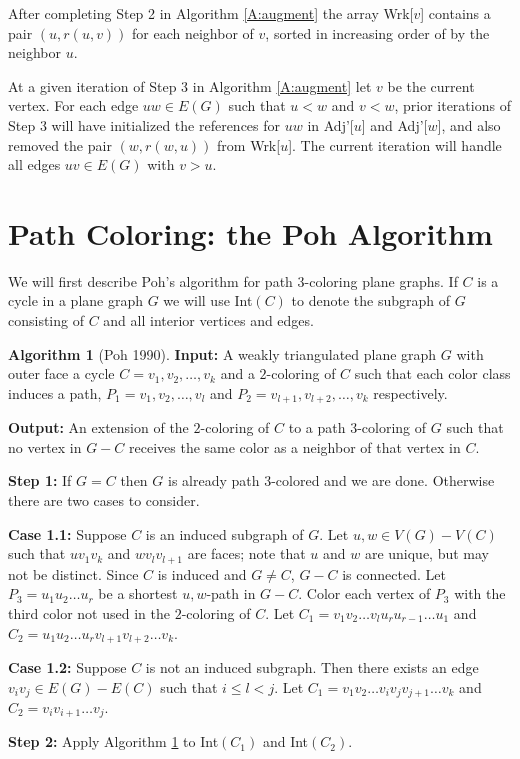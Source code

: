 \documentclass[12pt,letterpaper]{article}
\theoremstyle{plain}
\theoremstyle{definition}
\theoremstyle{break}
\newtheorem{algorithm}[lemma]{Algorithm}     %
\begin{document}
After completing Step 2 in Algorithm \ref{A:augment} the array Wrk[$v$] contains
a pair $(u,r(u,v))$ for each neighbor of $v$, sorted in increasing order of by
the neighbor $u$.

At a given iteration of Step 3 in Algorithm \ref{A:augment} let $v$ be the
current vertex. For each edge $uw\in E(G)$ such that
$u<w$ and $v<w$, prior iterations of Step 3 will have initialized the
references for $uw$ in Adj'[$u$] and Adj'[$w$], and also removed the pair
$(w,r(w,u))$ from Wrk[$u$]. The current iteration will handle all edges
$uv\in E(G)$ with $v>u$.

\section{Path Coloring: the Poh Algorithm}

We will first describe Poh's algorithm for path $3$-coloring plane graphs.
If $C$ is a cycle in a plane graph $G$ we will use Int$(C)$ to denote
the subgraph of $G$ consisting of $C$ and all interior vertices and edges.

\begin{algorithm}[Poh 1990] \label{A:planar3}
\textbf{Input:} A weakly triangulated plane graph $G$ with outer face a
cycle $C=v_1,v_2,\ldots, v_k$ and a $2$-coloring of $C$ such
that each color class induces a path, $P_1=v_1,v_2,\ldots, v_l$ and
$P_2=v_{l+1},v_{l+2},\ldots, v_k$ respectively.

\textbf{Output:} An extension of the $2$-coloring of $C$ to a path
$3$-coloring of $G$ such that no vertex in $G-C$ receives the same color as a
neighbor of that vertex in $C$.

\textbf{Step 1:} If $G=C$ then $G$ is already path $3$-colored and we
are done. Otherwise there are two cases to consider.

\textbf{Case 1.1:} Suppose $C$ is an induced subgraph of $G$. Let
$u,w\in V(G)-V(C)$ such that $uv_1v_k$ and $wv_lv_{l+1}$ are faces; note that
$u$ and $w$ are unique, but may not be distinct. Since $C$ is induced and
$G\ne C$, $G-C$ is connected.
Let $P_3=u_1u_2\ldots u_r$ be a shortest $u,w$-path in $G-C$.
Color each vertex of $P_3$ with the third color not used in the $2$-coloring of
$C$. Let $C_1=v_1v_2\ldots v_lu_ru_{r-1}\ldots u_1$ and
$C_2=u_1u_2\ldots u_rv_{l+1}v_{l+2}\ldots v_k$.

\textbf{Case 1.2:} Suppose $C$ is not an induced subgraph. Then there
exists an edge $v_iv_j\in E(G)-E(C)$ such that $i\le l < j$. Let
$C_1=v_1v_2\ldots v_iv_jv_{j+1}\ldots v_k$
and $C_2=v_iv_{i+1}\ldots v_j$.

\textbf{Step 2:} Apply Algorithm \ref{A:planar3} to
Int$(C_1)$ and Int$(C_2)$.
\end{algorithm}
\end{document}
